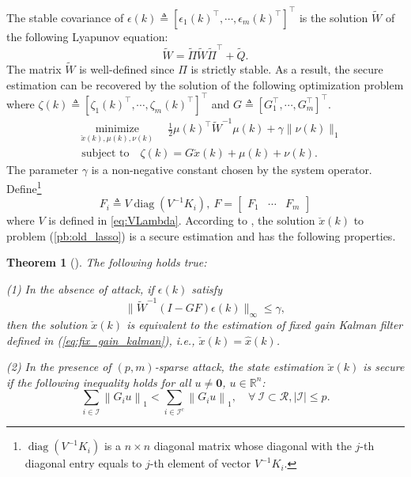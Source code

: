 \documentclass{ieeetrans}   %
\newcommand{\Rb}{{\mathbb{R}}}
\newcommand{\Ic}{{\mathcal{I}}}
\newcommand{\Rc}{{\mathcal{R}}}
\DeclareMathOperator{\diag}{{diag}}
\newtheorem{theorem}{\textbf{Theorem}}
\begin{document}
The stable covariance of $\epsilon(k)\triangleq\left[\epsilon_1(k)^\top,\cdots,\epsilon_m(k)^\top\right]^\top$ is the solution $\tilde{W}$ of the following Lyapunov equation:
$$
\tilde{W}=\tilde{\Pi} \tilde{W} \tilde{\Pi}^{\top}+\tilde{Q}.
$$ 
The matrix $\tilde{W}$ is well-defined since $\Pi$ is strictly stable. As a result, the secure estimation can be recovered by the solution of the following optimization problem where $\zeta(k)\triangleq\left[\zeta_1(k)^\top,\cdots,\zeta_m(k)^\top\right]^\top $ and $G\triangleq\left[G^\top_1,\cdots,G^\top_m\right]^\top $.
\begin{subequations}\label{pb:old_lasso}
	\begin{align}
		&\underset{\check{x}(k), \mu(k), \nu(k)}{\operatorname{minimize}}\quad \frac{1}{2} \mu(k)^\top \tilde{W}^{-1} \mu(k) + \gamma \|\nu(k)\|_1 \label{min:old_lasso} \\
		& \text{ subject to}\quad
		\zeta(k)=
		G \check{x}(k)+\mu(k)+\nu(k). \label{eq:old_lasso}
	\end{align}
\end{subequations}
The parameter $\gamma$ is a non-negative constant chosen by the system operator.
Define\footnote{$\diag(V^{-1}K_i)$ is a $n\times n$ diagonal matrix whose diagonal with the $j$-th diagonal entry equals to $j$-th element of vector $V^{-1}K_i$.} 
$$F_i\triangleq V\diag(V^{-1}K_i),\ F=\begin{bmatrix} F_1&\cdots & F_m \end{bmatrix}$$
where $V$ is defined in \eqref{eq:VLambda}.
According to \cite{liuxinghua-TAC2020}, the solution $\check{x}(k)$ to problem (\ref{pb:old_lasso}) is a secure estimation and has the following properties.
\begin{theorem}[\hspace{-0.01pt}\cite{liuxinghua-TAC2020}]\label{th:TAC}
	The following holds true:
	
	(1) In the absence of attack, if $\epsilon(k)$ satisfy $$\|\tilde{W}^{-1}\left(I-GF\right)\epsilon(k)\|_\infty\leq\gamma,$$
	then the solution $\check{x}(k)$ is equivalent to the estimation of fixed gain Kalman filter defined in (\ref{eq:fix_gain_kalman}), i.e., $\check{x}(k)=\hat{x}(k)$.  %

	(2) In the presence of $(p, m)$-sparse attack, the state estimation $\check{x}(k)$ is secure if the following inequality holds for all $u \neq \mathbf{0}$, $u\in\Rb^n$:
\begin{equation}\label{eq:cond}
	\sum_{i \in \mathcal{I}}\left\|G_{i} u\right\|_{1}<\sum_{i \in \mathcal{I}^{c}}\left\|G_{i} u\right\|_{1}, \quad \forall\ \Ic\subset \Rc, |\mathcal{I}|\leq p .
\end{equation}
\end{theorem}
\end{document}
